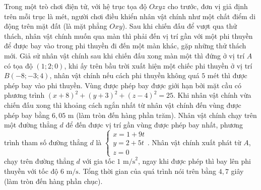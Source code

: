 \begin{ex}
	Trong một trò chơi điện tử, với hệ trục tọa độ $Oxyz$ cho trước, đơn vị giả định trên mỗi trục là mét, người chơi điều khiển nhân vật chính như một chất điểm di động trên mặt đất (là mặt phẳng $Oxy$). Sau khi chiến đấu để vượt qua thử thách, nhân vật chính muốn qua màn thì phải đến vị trí gần với một phi thuyền để được bay vào trong phi thuyền đi đến một màn khác, gặp những thử thách mới. Giả sử nhân vật chính sau khi chiến đấu xong màn một thì đứng ở vị trí $A$ có tọa độ $\left(1; 2; 0\right)$, khi ấy trên bầu trời xuất hiện một chiếc phi thuyền ở vị trí $B\left(-8; -3; 4\right)$, nhân vật chính nếu cách phi thuyền không quá $5$ mét thì được phép bay vào phi thuyền.
	\choiceTF
	{\True Vùng được phép bay được giới hạn bởi mặt cầu có phương trình $\left(x+8\right)^2+\left(y+3\right)^2+\left(z-4\right)^2 = 25$.}
	{\True Khi nhân vật chính vừa chiến đấu xong thì khoảng cách ngắn nhất từ nhân vật chính đến vùng được phép bay bằng $6{,}05\text{ m}$ (làm tròn đến hàng phần trăm).}
	{\True Nhân vật chính chạy trên một đường thẳng $d$ để đến được vị trí gần vùng được phép bay nhất, phương trình tham số đường thẳng $d$ là $\begin{cases} x = 1 + 9t \\ y = 2 + 5t \\ z = 0 \end{cases}$.}
	{\True Nhân vật chính xuất phát từ $A$, chạy trên đường thẳng $d$ với gia tốc $1\text{ m/s}^2$, ngay khi được phép thì bay lên phi thuyền với tốc độ $6\text{ m/s}$. Tổng thời gian của quá trình nói trên bằng $4{,}7$ giây (làm tròn đến hàng phần chục).}
\end{ex}
